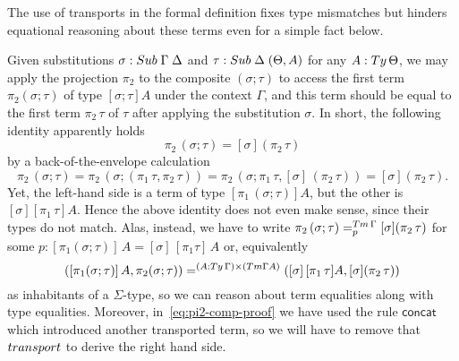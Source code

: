 \documentclass[a4paper,UKenglish,numberwithinsect,cleveref,thm-restate]{lipics-v2021}
\begin{document}
The use of transports in the formal definition fixes type mismatches but hinders equational reasoning about these terms even for a simple fact below.
\begin{example}\label{ex:pi2-comp}
  Given substitutions $\sigma : \Sub\;\Gamma\; \Delta$ and $\tau : \Sub\;\Delta\;(\Theta, A)$ for any $A : \Ty\,\Theta$, we may apply the projection $\pi_2$ to the composite $(\sigma; \tau)$ to access the first term $\pi_2(\sigma; \tau)$ of type $[\sigma;\tau] A$ under the context $\Gamma$, and this term should be equal to the first term $\pi_2\,\tau$ of $\tau$ after applying the substitution $\sigma$. 
  In short, the following identity apparently holds
  \[
    \pi_2\,(\sigma ; \tau) = [\sigma] (\pi_2\,\tau)
  \]
  by a back-of-the-envelope calculation
  \begin{equation} \label{eq:pi2-comp-proof}
    \pi_2\,(\sigma ; \tau) 
    = \pi_2\,(\sigma; (\pi_1\,\tau, \pi_2\,\tau))
    = \pi_2\,(\sigma;\pi_1\,\tau, [\sigma]\,(\pi_2\,\tau))
    = [\sigma] (\pi_2\,\tau).
  \end{equation}
  Yet, the left-hand side is a term of type $[\pi_1\,(\sigma;\tau)] A$, but the other is $[\sigma] [\pi_1\,\tau] A$.
  Hence the above identity does not even make sense, since their types do not match.
  Alas, instead, we have to write $\pi_2\,(\sigma ; \tau) =^{\Tm\,\Gamma}_{p} [\sigma] (\pi_2\,\tau)$ for some $p: [\pi_1(\sigma; \tau)]\,A = [\sigma]\,[\pi_1\tau]\,A$ or, equivalently
  \begin{equation}\label{eq:pi2-comp-real-proof}
    ([\pi_1(\sigma; \tau)]\,A, \pi_2(\sigma; \tau)) =^{(A : \Ty\,\Gamma) \times (\Tm \Gamma A)} ([\sigma]\,[\pi_1\,\tau]A, [\sigma] (\pi_2\,\tau))
  \end{equation}
  as inhabitants of a $\Sigma$-type, so we can reason about term equalities along with type equalities.
  Moreover, in~\eqref{eq:pi2-comp-proof} we have used the rule $\mathsf{concat}$ which introduced another transported term, so we will have to remove that $\transp$ to derive the right hand side.


\end{example}
\end{document}
